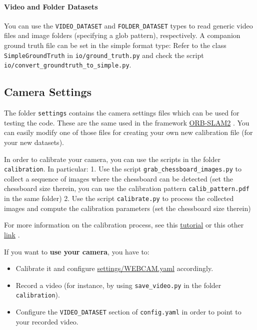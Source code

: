 \documentclass{article}
\let\oldparagraph\paragraph
\renewcommand{\paragraph}[1]{\oldparagraph{#1}\mbox{}}
\begin{document}
\hypertarget{video-and-folder-datasets}{%
\paragraph{Video and Folder Datasets}\label{video-and-folder-datasets}}

You can use the \texttt{VIDEO\_DATASET} and \texttt{FOLDER\_DATASET}
types to read generic video files and image folders (specifying a glob
pattern), respectively. A companion ground truth file can be set in the
simple format type: Refer to the class \texttt{SimpleGroundTruth} in
\texttt{io/ground\_truth.py} and check the script
\texttt{io/convert\_groundtruth\_to\_simple.py}.
\hypertarget{camera-settings}{%
\subsection{Camera Settings}\label{camera-settings}}

The folder \texttt{settings} contains the camera settings files which
can be used for testing the code. These are the same used in the
framework \href{https://github.com/raulmur/ORB_SLAM2}{ORB-SLAM2} \cite{ORB_SLAM2}. You
can easily modify one of those files for creating your own new
calibration file (for your new datasets).

In order to calibrate your camera, you can use the scripts in the folder
\texttt{calibration}. In particular: 1. Use the script
\texttt{grab\_chessboard\_images.py} to collect a sequence of images
where the chessboard can be detected (set the chessboard size therein,
you can use the calibration pattern \texttt{calib\_pattern.pdf} in the
same folder) 2. Use the script \texttt{calibrate.py} to process the
collected images and compute the calibration parameters (set the
chessboard size therein)

For more information on the calibration process, see this
\href{https://learnopencv.com/camera-calibration-using-opencv/}{tutorial} \cite{learnopencv}
or this other
\href{https://docs.opencv.org/4.x/dc/dbb/tutorial_py_calibration.html}{link} \cite{opencv}.

If you want to \textbf{use your camera}, you have to: 
\begin{itemize}
\item Calibrate it and configure \href{https://github.com/luigifreda/pyslam/blob/master/settings/WEBCAM.yaml}{settings/WEBCAM.yaml} accordingly.
\item Record a video (for instance, by using \texttt{save\_video.py} in the folder \texttt{calibration}). 
\item Configure the \texttt{VIDEO\_DATASET} section of \texttt{config.yaml} in order to point to your recorded video.
\end{itemize}
\end{document}
